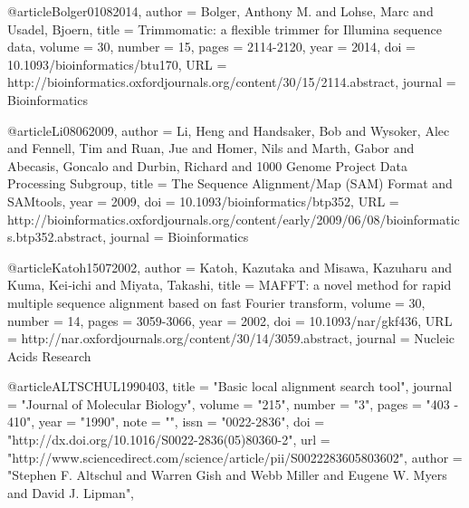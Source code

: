 @article{Bolger01082014,
author = {Bolger, Anthony M. and Lohse, Marc and Usadel, Bjoern}, 
title = {Trimmomatic: a flexible trimmer for Illumina sequence data},
volume = {30}, 
number = {15}, 
pages = {2114-2120}, 
year = {2014}, 
doi = {10.1093/bioinformatics/btu170}, 
URL = {http://bioinformatics.oxfordjournals.org/content/30/15/2114.abstract}, 
journal = {Bioinformatics} 
}

@article{Li08062009,
author = {Li, Heng and Handsaker, Bob and Wysoker, Alec and Fennell, Tim and Ruan, Jue and Homer, Nils and Marth, Gabor and Abecasis, Goncalo and Durbin, Richard and 1000 Genome Project Data Processing Subgroup}, 
title = {The Sequence Alignment/Map (SAM) Format and SAMtools},
year = {2009}, 
doi = {10.1093/bioinformatics/btp352}, 
URL = {http://bioinformatics.oxfordjournals.org/content/early/2009/06/08/bioinformatics.btp352.abstract}, 
journal = {Bioinformatics} 
}

@article{Katoh15072002,
author = {Katoh, Kazutaka and Misawa, Kazuharu and Kuma, Kei‐ichi and Miyata, Takashi}, 
title = {MAFFT: a novel method for rapid multiple sequence alignment based on fast Fourier transform},
volume = {30}, 
number = {14}, 
pages = {3059-3066}, 
year = {2002}, 
doi = {10.1093/nar/gkf436}, 
URL = {http://nar.oxfordjournals.org/content/30/14/3059.abstract}, 
journal = {Nucleic Acids Research} 
}

@article{ALTSCHUL1990403,
title = "Basic local alignment search tool",
journal = "Journal of Molecular Biology",
volume = "215",
number = "3",
pages = "403 - 410",
year = "1990",
note = "",
issn = "0022-2836",
doi = "http://dx.doi.org/10.1016/S0022-2836(05)80360-2",
url = "http://www.sciencedirect.com/science/article/pii/S0022283605803602",
author = "Stephen F. Altschul and Warren Gish and Webb Miller and Eugene W. Myers and David J. Lipman",
}
